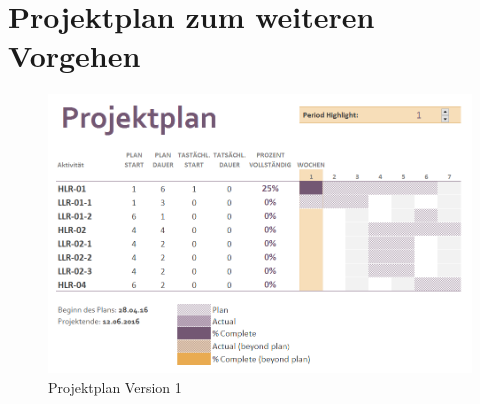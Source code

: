 \documentclass[a4paper,12pt]{article}                                         %
\numberwithin{table}{section}                               %
\numberwithin{figure}{section}                              %
\renewcommand{\thetable}{\arabic{section}.\arabic{table}}   %
\renewcommand{\thefigure}{\arabic{section}.\arabic{figure}} %
\begin{document}
	\newpage
	\section{Projektplan zum weiteren Vorgehen}
	
		\begin{figure}[h]
			\begin{center}
				\includegraphics[scale=0.8]{../Bilder/PlanV1.png}
			\end{center}
			\caption{Projektplan Version 1}
		\end{figure}
		
	\renewcommand{\thetable}{\Alph{section}.\arabic{table}}              %
	\renewcommand{\thefigure}{\Alph{section}.\arabic{figure}}            %
	\renewcommand{\thelstlisting}{\Alph{section}.\arabic{lstlisting}}    %
	
	\begin{appendix}
	\end{appendix}
	
	
	
	
\end{document}
